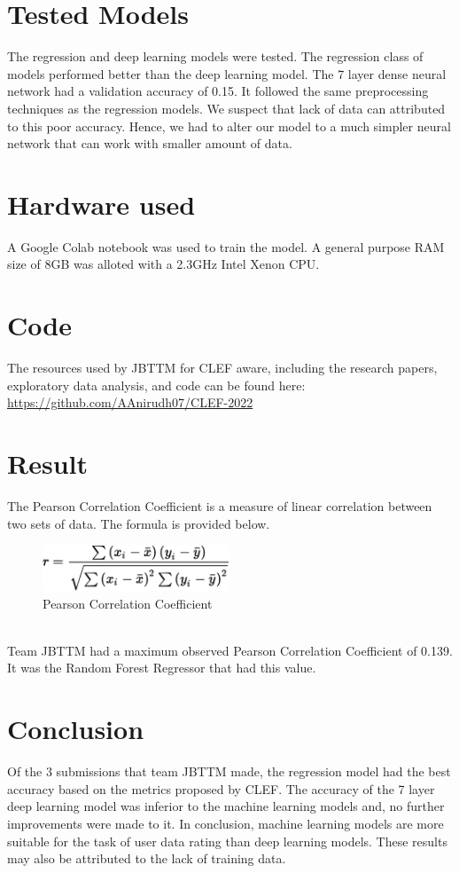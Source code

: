 \documentclass{llncs}
\begin{document}
\section{Tested Models}
The regression and deep learning models were tested. The regression class of models performed better than the deep learning model. The 7 layer dense neural network had a validation accuracy of 0.15. It followed the same preprocessing techniques as the regression models. We suspect that lack of data can attributed to this poor accuracy. Hence, we had to alter our model to a much simpler neural network that can work with smaller amount of data. 


\section{Hardware used}
A Google Colab notebook was used to train the model. A general purpose RAM 
size of 8GB was alloted with a 2.3GHz Intel Xenon CPU.


\section {Code}
The resources used by JBTTM for CLEF aware, including the research papers, exploratory data analysis, and code can be found here: \url{https://github.com/AAnirudh07/CLEF-2022}

\section{Result}
The Pearson Correlation Coefficient is a measure of linear correlation between two sets of data. The formula is provided below.
\begin{figure}[h]
    \centering
    \includegraphics[width=0.5\textwidth,height=0.5\textheight,keepaspectratio]{correlation_coefficient_formula.png}
    \caption{Pearson Correlation Coefficient}
    \label{fig:Randomforest}
\end{figure}
\hfill\\ Team JBTTM had a maximum observed Pearson Correlation Coefficient of 0.139. It was the Random Forest Regressor that had this value.  

\section{Conclusion}
Of the 3 submissions that team JBTTM made, the regression model had the best accuracy based on the metrics proposed by CLEF. The accuracy of the 7 layer deep learning model was inferior to the machine learning models and, no further improvements were made to it. In conclusion, machine learning models are more suitable for the task of user data rating than deep learning models. These results may also be attributed to the lack of training data.



%


%
\end{document}
